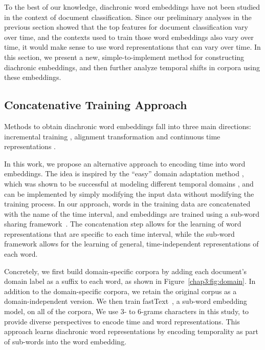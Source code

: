 To the best of our knowledge, diachronic word embeddings have not been studied in the context of document classification. 
Since our preliminary analyses in the previous section showed that the top features for document classification vary over time, and the contexts used to train those word embeddings also vary over time, 
it would make sense to use word representations that can vary over time.
In this section, we present a new, simple-to-implement method for constructing diachronic embeddings, and then further analyze temporal shifts in corpora using these embeddings.

\subsection{Concatenative Training Approach}

Methods to obtain diachronic word embeddings fall into three main directions: incremental training \cite{kim2014temporal}, alignment transformation \cite{kulkarni2015statistically, hamilton2016diachronic, yao2018dynamic} and continuous time representations \cite{rosenfeld2018deep, rudolph2018dynamic}.

In this work, we propose an alternative approach 
to encoding time into word embeddings.
The idea is inspired by the ``easy'' domain adaptation method \cite{daume2007frustratingly}, which was shown to be successful at modeling different temporal domains \cite{huang2018examining}, and can be implemented by simply modifying the input data without modifying the training process.
In our approach, words in the training data are concatenated with the name of the time interval,
and embeddings are trained using a sub-word sharing framework~\cite{bojanowski2017enriching}. 
The concatenation step allows for the learning of word representations that are specific to each time interval, while the sub-word framework allows for the learning of general, time-independent representations of each word.

Concretely,
we first build domain-specific corpora by adding each document's domain label as a suffix to each word, as shown in  Figure~\ref{chap3:fig:domain}. 
In addition to the domain-specific corpora,
we retain the original corpus as a domain-independent version.
We then train fastText~\cite{bojanowski2017enriching}, a sub-word embedding model, on all of the corpora,
We use 3- to 6-grams characters in this study, to provide  diverse perspectives to encode time and word representations. 
This approach learns diachronic word representations by encoding temporality as part of sub-words into the word embedding. 

